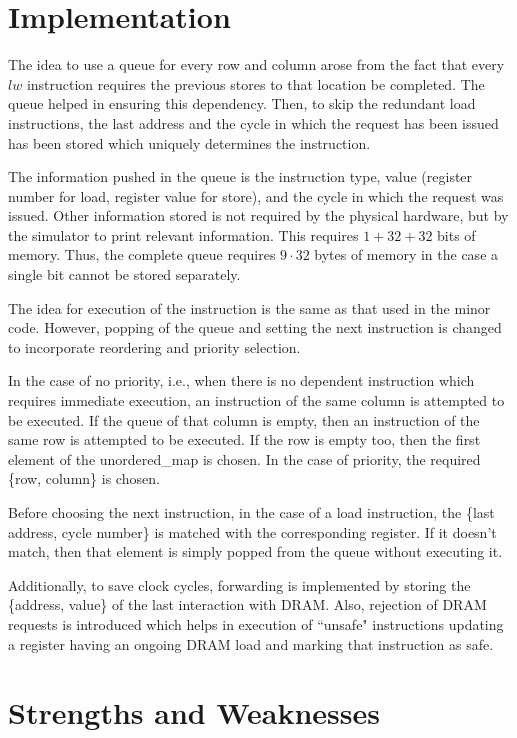 \documentclass{article}
\begin{document}
\section{Implementation}
The idea to use a queue for every row and column arose from the fact that every $lw$ instruction requires the previous stores to that location be completed. The queue helped in ensuring this dependency. Then, to skip the redundant load instructions, the last address and the cycle in which the request has been issued has been stored which uniquely determines the instruction.\par
The information pushed in the queue is the instruction type, value (register number for load, register value for store), and the cycle in which the request was issued. Other information stored is not required by the physical hardware, but by the simulator to print relevant information. This requires $1+32+32$ bits of memory. Thus, the complete queue requires $9\cdot32$ bytes of memory in the case a single bit cannot be stored separately.\par
The idea for execution of the instruction is the same as that used in the minor code. However, popping of the queue and setting the next instruction is changed to incorporate reordering and priority selection.\par
In the case of no priority, i.e., when there is no dependent instruction which requires immediate execution, an instruction of the same column is attempted to be executed. If the queue of that column is empty, then an instruction of the same row is attempted to be executed. If the row is empty too, then the first element of the unordered\_map is chosen. In the case of priority, the required \{row, column\} is chosen.\par
Before choosing the next instruction, in the case of a load instruction, the \{last address, cycle number\} is matched with the corresponding register. If it doesn't match, then that element is simply popped from the queue without executing it.\par
Additionally, to save clock cycles, forwarding is implemented by storing the \{address, value\} of the last interaction with DRAM. Also, rejection of DRAM requests is introduced which helps in execution of ``unsafe" instructions updating a register having an ongoing DRAM load and marking that instruction as safe.


\section{Strengths and Weaknesses}
\end{document}
